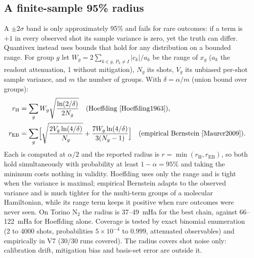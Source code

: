 \documentclass[10pt,a4paper]{article}
\begin{document}
\subsection{A finite-sample 95\% radius}
A $\pm2\sigma$ band is only approximately 95\% and fails for rare outcomes: if a term is $+1$ in every observed shot its sample variance is zero, yet the truth can differ. Quantivex instead uses bounds that hold for any distribution on a bounded range. For group $g$ let $W_g=2\sum_{k\in g,\,P_k\ne I}|c_k|/a_k$ be the range of $x_g$ ($a_k$ the readout attenuation, 1 without mitigation), $N_g$ its shots, $V_g$ its unbiased per-shot sample variance, and $m$ the number of groups. With $\delta=\alpha/m$ (union bound over groups):
\begin{align}
r_{\mathrm H}&=\sum_g W_g\sqrt{\frac{\ln(2/\delta)}{2N_g}}\quad\text{(Hoeffding~\cite{Hoeffding1963})},\\
r_{\mathrm{EB}}&=\sum_g\Bigl[\sqrt{\frac{2V_g\ln(4/\delta)}{N_g}}+\frac{7W_g\ln(4/\delta)}{3(N_g-1)}\Bigr]\quad\text{(empirical Bernstein~\cite{Maurer2009})}.
\end{align}
Each is computed at $\alpha/2$ and the reported radius is $r=\min(r_{\mathrm H},r_{\mathrm{EB}})$, so both hold simultaneously with probability at least $1-\alpha=95\%$ and taking the minimum costs nothing in validity. Hoeffding uses only the range and is tight when the variance is maximal; empirical Bernstein adapts to the observed variance and is much tighter for the multi-term groups of a molecular Hamiltonian, while its range term keeps it positive when rare outcomes were never seen. On Torino N$_2$ the radius is 37--49~mHa for the best chain, against 66--122~mHa for Hoeffding alone. Coverage is tested by exact binomial enumeration (2 to 4000 shots, probabilities $5\times10^{-4}$ to $0.999$, attenuated observables) and empirically in V7 (30/30 runs covered). The radius covers shot noise only: calibration drift, mitigation bias and basis-set error are outside it.
\end{document}
